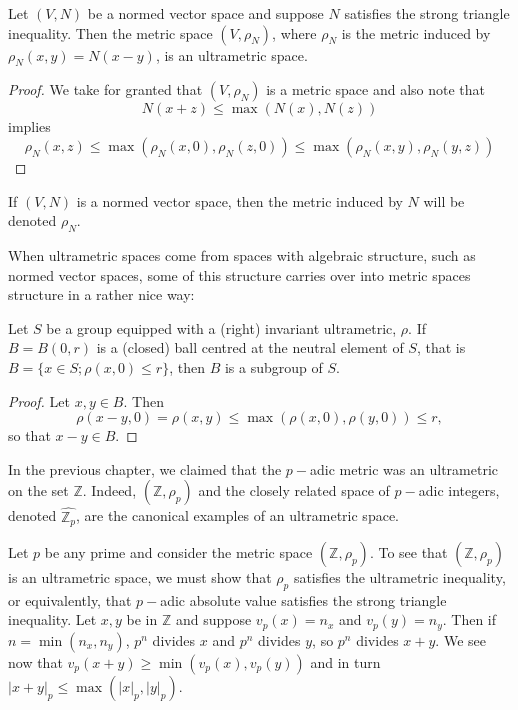 \begin{proposition}
	Let $(V,N)$ be a normed vector space and suppose $N$ satisfies the strong triangle inequality. Then the metric space $(V,\rho_N)$, where $\rho_N$ is the metric induced by $\rho_N(x,y) = N(x-y)$, is an ultrametric space.
\end{proposition}

\begin{proof}
We take for granted that  $(V,\rho_N)$ is a metric space and also note that 
\[N(x + z) \leq \max(N(x), N(z))\]
 implies  
\[\rho_N(x,z) \leq \max(\rho_N(x,0), \rho_N(z,0)) \leq \max(\rho_N(x,y), \rho_N(y,z))\]
\end{proof}

\begin{notation*}
 If $(V, N)$ is a normed vector space, then the metric induced by $N$ will be denoted $\rho_N$.
\end{notation*}

When ultrametric spaces come from spaces with algebraic structure, such as normed vector spaces, some of this structure carries over into metric spaces structure in a rather nice way:\\

\begin{proposition}
\cite{ar} Let $S$ be a  group equipped with a (right) invariant ultrametric, $\rho$. If $B=B(0,r)$ is a (closed) ball centred at the neutral element of $S$, that is $B=\{x \in S; \rho(x,0) \leq r\}$, then $B$ is a subgroup of $S$.
\end{proposition}

\begin{proof}
Let $x,y \in B$. Then \[\rho(x-y,0) = \rho(x,y)  \leq \max(\rho(x,0), \rho(y,0)) \leq r,\]
so that $x-y \in B$.
\end{proof}
 
In the previous chapter, we claimed that the $p-$adic metric was an ultrametric on the set $\mathbb{Z}$. Indeed, $(\mathbb{Z}, \rho_p)$ and the closely related space of $p-$adic integers, denoted $\widehat{\mathbb{Z}_p}$, are the canonical examples of an ultrametric space. \\

\begin{example} 
Let $p$ be any prime and consider the metric space $(\mathbb{Z}, \rho_p)$. To see that $(\mathbb{Z}, \rho_p)$ is an ultrametric space, we must show that $\rho_p$ satisfies the ultrametric inequality, or equivalently, that $p-$adic absolute value satisfies the strong triangle inequality. Let $x,y$ be in $\mathbb{Z}$ and suppose $v_p(x)= n_x$ and $v_p(y)= n_y$. Then if $n=\min(n_x,n_y)$, $p^n $ divides $x$ and $p^n$ divides $y$, so $p^n$ divides $x +y$. We see now that $v_p(x+y) \geq \min(v_p(x),  v_p(y))$ and in turn $\lvert x + y \rvert_p \leq \max(\lvert x \rvert_p, \lvert y \rvert_p)$.
\end{example}

